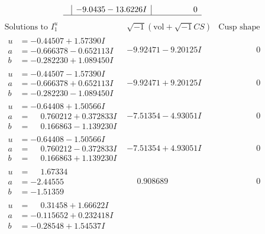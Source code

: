 \documentclass[1p]{elsarticle_modified}
\theoremstyle{definition}
\newcommand{\I}{\sqrt{-1}}
\begin{document}
$$\begin{array}{c|c|c}
 & -9.0435 - 13.6226 I & \phantom{-0.000000 } 0\\
 \hline 
 \end{array}$$\newpage$$\begin{array}{c|c|c}  
\text{Solutions to }I^u_{1}& \I (\text{vol} + \sqrt{-1}CS) & \text{Cusp shape}\\
 \hline 
\begin{aligned}
u &= -0.44507 + 1.57390 I \\
a &= -0.666378 - 0.652113 I \\
b &= -0.282230 + 1.089450 I\end{aligned}
 & -9.92471 - 9.20125 I & \phantom{-0.000000 } 0 \\ \hline\begin{aligned}
u &= -0.44507 - 1.57390 I \\
a &= -0.666378 + 0.652113 I \\
b &= -0.282230 - 1.089450 I\end{aligned}
 & -9.92471 + 9.20125 I & \phantom{-0.000000 } 0 \\ \hline\begin{aligned}
u &= -0.64408 + 1.50566 I \\
a &= \phantom{-}0.760212 + 0.372833 I \\
b &= \phantom{-}0.166863 - 1.139230 I\end{aligned}
 & -7.51354 - 4.93051 I & \phantom{-0.000000 } 0 \\ \hline\begin{aligned}
u &= -0.64408 - 1.50566 I \\
a &= \phantom{-}0.760212 - 0.372833 I \\
b &= \phantom{-}0.166863 + 1.139230 I\end{aligned}
 & -7.51354 + 4.93051 I & \phantom{-0.000000 } 0 \\ \hline\begin{aligned}
u &= \phantom{-}1.67334\phantom{ +0.000000I} \\
a &= -2.44555\phantom{ +0.000000I} \\
b &= -1.51359\phantom{ +0.000000I}\end{aligned}
 & \phantom{-}0.908689\phantom{ +0.000000I} & \phantom{-0.000000 } 0 \\ \hline\begin{aligned}
u &= \phantom{-}0.31458 + 1.66622 I \\
a &= -0.115652 + 0.232418 I \\
b &= -0.28548 + 1.54537 I\end{aligned}

\end{array}$$
\end{document}
